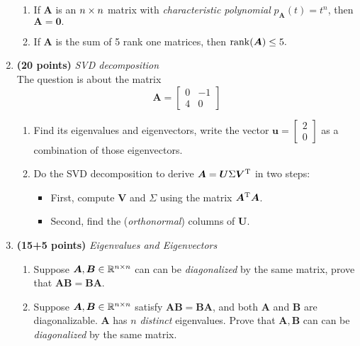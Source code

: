 \begin{enumerate}
\begin{enumerate}
\item
If $\bm A$ is an $n\times n$ matrix with \textit{characteristic polynomial} $p_{\bm A}(t)=t^n$, then $\bm A=\bm 0.$\\
\item
If $\bm A$ is the sum of 5 rank one matrices, then $\operatorname{rank}(\bm A)\le5.$
\end{enumerate}
\newpage
\item \textbf{(20 points)} \textit{SVD decomposition} \\
The question is about the matrix
\[
\bm A=\begin{bmatrix}
0&-1\\4&0
\end{bmatrix}
\]
\begin{enumerate}
\item
Find its eigenvalues and eigenvectors, write the vector $\bm u=\begin{bmatrix}
2\\0
\end{bmatrix}$ as a combination of those eigenvectors.\\
\item
Do the SVD decomposition to derive $\bm A=\bm U\Sigma\bm V^{\mathrm T}$ in two steps:
\begin{itemize}
\item
First, compute $\bm V$ and $\Sigma$ using the matrix $\bm A^{\mathrm T}\bm A$.
\item
Second, find the (\textit{orthonormal}) columns of $\bm U$.
\end{itemize}
\end{enumerate}
\newpage
\item \textbf{(15+5 points)} \textit{Eigenvalues and Eigenvectors}\\
\begin{enumerate}
\item
Suppose $\bm A,\bm B\in\mathbb{R}^{n\times n}$ can can be \textit{diagonalized} by the same matrix, prove that $\bm{AB}=\bm{BA}.$\\
\item
Suppose $\bm A,\bm B\in\mathbb{R}^{n\times n}$ satisfy $\bm{AB}=\bm{BA}$, and both $\bm A$ and $\bm B$ are diagonalizable. $\bm A$ has $n$ \textit{distinct} eigenvalues. Prove that $\bm A,\bm B$ can can be \textit{diagonalized} by the same matrix.\\

\end{enumerate}
\end{enumerate}
